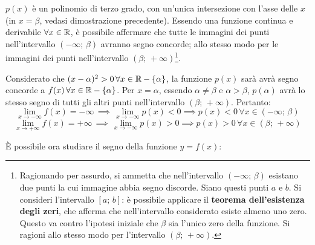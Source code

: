 \documentclass[a4paper, oneside, titlepage, reqno]{book}
\begin{document}
$p(x)$ è un polinomio di terzo grado, con un'unica intersezione con l'asse delle $x$ (in $x=\beta$, vedasi dimostrazione precedente). Essendo una funzione continua e derivabile $\forall x\in\mathbb{R}$, è possibile affermare che tutte le immagini dei punti nell'intervallo $(-\infty; \,\beta)$ avranno segno concorde; allo stesso modo per le immagini dei punti nell'intervallo $(\beta; \,+\infty)$\footnote{Ragionando per assurdo, si ammetta che nell'intervallo $(-\infty; \,\beta)$ esistano due punti la cui immagine abbia segno discorde. Siano questi punti $a$ e $b$. Si consideri l'intervallo $[a;\,b]$: è possibile applicare il \textbf{teorema dell'esistenza degli zeri}, che afferma che nell'intervallo considerato esiste almeno uno zero. Questo va contro l'ipotesi iniziale che $\beta$ sia l'unico zero della funzione. Si ragioni allo stesso modo per l'intervallo $(\beta; \,+\infty)$.}.

Considerato che $(x-\alpha)^2>0\,\forall x\in \mathbb{R}-\{\alpha\}$, la funzione $p(x)$ sarà avrà segno concorde a $f(x)\,\forall x\in \mathbb{R}-\{\alpha\}$. Per $x=\alpha$, essendo $\alpha\neq\beta$ e $\alpha>\beta$, $p(\alpha)$ avrà lo stesso segno di tutti gli altri punti nell'intervallo $(\beta; \,+\infty)$. Pertanto:
\[
\lim_{x\to-\infty}f(x)=-\infty\,\implies\,\lim_{x\to-\infty}p(x)<0\implies p(x)<0\,\forall x\in (-\infty;\,\beta)
\]
\[
\lim_{x\to+\infty}f(x)=+\infty\,\implies\,\lim_{x\to-\infty}p(x)>0\implies p(x)>0\,\forall x\in(\beta; \,+\infty)
\]

È possibile ora studiare il segno della funzione $y=f(x)$:
\begin{center}
\end{center}
\end{document}

